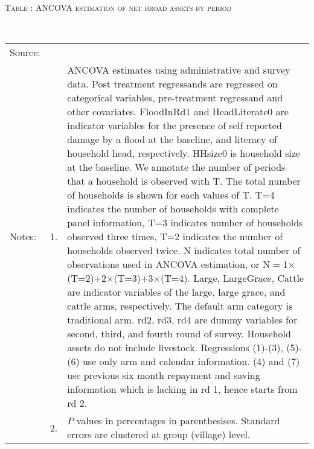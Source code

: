 \hspace{-1cm}\begin{minipage}[t]{14cm}
\hfil\textsc{\normalsize Table \thetable: ANCOVA estimation of net broad assets by period\label{tab ANCOVA net broad assets timevarying}}\\
\setlength{\tabcolsep}{1pt}
\setlength{\baselineskip}{8pt}
\renewcommand{\arraystretch}{.55}
\hfil{}\\
\renewcommand{\arraystretch}{.8}
\setlength{\tabcolsep}{1pt}
\begin{tabular}{>{\hfill\scriptsize}p{1cm}<{}>{\hfill\scriptsize}p{.25cm}<{}>{\scriptsize}p{12cm}<{\hfill}}
Source:& \multicolumn{2}{l}{\scriptsize Estimated with GUK administrative and survey data.}\\
Notes: & 1. & ANCOVA estimates using administrative and survey data. Post treatment regressands are regressed on categorical variables, pre-treatment regressand and other covariates. \textsf{FloodInRd1} and \textsf{HeadLiterate0} are indicator variables for the presence of self reported damage by a flood at the baseline, and literacy of household head, respectively. \textsf{HHsize0} is household size at the baseline. We annotate the number of periods that a household is observed with \textsf{T}. The total number of households is shown for each values of \textsf{T}. \textsf{T=4} indicates the number of households with complete panel information, \textsf{T=3} indicates number of households observed three times, \textsf{T=2} indicates the number of households observed twice. \textsf{N} indicates total number of observations used in ANCOVA estimation, or \textsf{N$=$1$\times$(T=2)+2$\times$(T=3)+3$\times$(T=4)}.  \textsf{Large}, \textsf{LargeGrace}, \textsf{Cattle} are indicator variables of the \textsf{large}, \textsf{large grace}, and \textsf{cattle} arms, respectively. The default arm category is \textsf{traditional} arm. \textsf{rd2, rd3, rd4} are dummy variables for second, third, and fourth round of survey.  Household assets do not include livestock. Regressions (1)-(3), (5)-(6) use only arm and calendar information. (4) and (7) use previous six month repayment and saving information which is lacking in rd 1, hence starts from rd 2.\\
& 2. & $P$ values in percentages in parenthesises. Standard errors are clustered at group (village) level.
\end{tabular}
\end{minipage}

